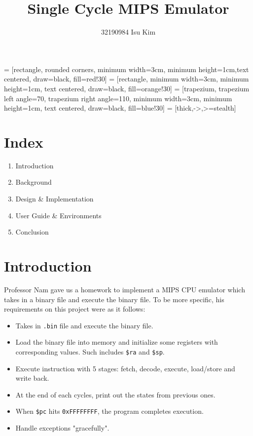 \documentclass{homework}
\begin{document}
\title{Single Cycle MIPS Emulator}
\author{32190984 Isu Kim}
\maketitle

\newenvironment{code}{\captionsetup{type=listing}}{}

 = [rectangle, rounded corners, minimum width=3cm, minimum height=1cm,text centered, draw=black, fill=red!30]
 = [rectangle, minimum width=3cm, minimum height=1cm, text centered, draw=black, fill=orange!30]
 = [trapezium, trapezium left angle=70, trapezium right angle=110, minimum width=3cm, minimum height=1cm, text centered, draw=black, fill=blue!30]
 = [thick,->,>=stealth]

\maketitle
\pagebreak

\section{Index}
\begin{enumerate}
   \item Introduction
   \item Background
   \item Design \& Implementation
   \item User Guide \& Environments
   \item Conclusion
\end{enumerate}
\pagebreak

\section{Introduction}
Professor Nam gave us a homework to implement a MIPS CPU emulator which takes in a binary file and execute the binary file. To be more specific, his requirements on this project were as it follows:

\begin{itemize}
    \item Takes in \texttt{.bin} file and execute the binary file.
    \item Load the binary file into memory and initialize some registers with corresponding values. Such includes \texttt{\$ra} and \texttt{\$sp}.
    \item Execute instruction with 5 stages: fetch, decode, execute, load/store and write back.
    \item At the end of each cycles, print out the states from previous ones.
    \item When \texttt{\$pc} hits \texttt{0xFFFFFFFF}, the program completes execution.
    \item Handle exceptions "gracefully".
\end{itemize}
\end{document}
